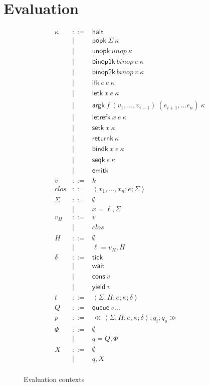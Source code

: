 \documentclass[twocolumn]{article}
\newcommand{\bnfdef}{::=}
\newcommand{\bnfalt}{\mathrel{\mid}}
\newcommand{\kw}[1]{\textsf{#1}}
\newcommand{\clos}[3]{\left<#1; #2; #3\right>}
\newcommand{\thread}[5]{\left<#1; #2; #3; #4; #5\right>}
\newcommand{\proc}[3]{\ll\!#1; #2; #3\!\gg}
\begin{document}
\section{Evaluation}

\begin{figure}
\begin{equation*}
\begin{array}{lcl}
  \kappa
     & \bnfdef & \kw{halt} \\
     & \bnfalt & \kw{popk}~ \Sigma~ \kappa \\
     & \bnfalt & \kw{unopk}~ unop~ \kappa \\
     & \bnfalt & \kw{binop1k}~ binop~ e~ \kappa \\
     & \bnfalt & \kw{binop2k}~ binop~ v~ \kappa  \\
     & \bnfalt & \kw{ifk}~ e~ e~ \kappa \\
     & \bnfalt & \kw{letk}~ x~ e~ \kappa \\
     & \bnfalt & \kw{argk}~ f~ (v_1, \ldots, v_{i-1})~ (e_{i+1}, \ldots e_n)~ \kappa \\
     & \bnfalt & \kw{letrefk}~ x~ e~ \kappa \\
     & \bnfalt & \kw{setk}~ x~ \kappa \\
     & \bnfalt & \kw{returnk}~ \kappa \\
     & \bnfalt & \kw{bindk}~ x~ e~ \kappa \\
     & \bnfalt & \kw{seqk}~ e~ \kappa \\
     & \bnfalt & \kw{emitk} \\
  v
     & \bnfdef & k \\
  clos
     & \bnfdef & \clos{x_1, \ldots, x_n}{e}{\Sigma} \\
  \Sigma
     & \bnfdef & \emptyset \\
     & \bnfalt & x = \ell, \Sigma \\
  v_H
     & \bnfdef & v \\
     & \bnfalt & clos \\
  H
     & \bnfdef & \emptyset \\
     & \bnfalt & \ell = v_H, H \\
  \delta
     & \bnfdef & \kw{tick} \\
     & \bnfalt & \kw{wait} \\
     & \bnfalt & \kw{cons}~ v \\
     & \bnfalt & \kw{yield}~ v \\
  t
     & \bnfdef & \thread{\Sigma}{H}{e}{\kappa}{\delta} \\
  Q
     & \bnfdef & \kw{queue}~ v \ldots \\
  p
     & \bnfdef & \proc{\thread{\Sigma}{H}{e}{\kappa}{\delta}}{q_i}{q_o} \\
  \Phi
     & \bnfdef & \emptyset \\
     & \bnfalt & q = Q, \Phi \\
  X
     & \bnfdef & \emptyset \\
     & \bnfalt & q, X \\
\end{array}
\end{equation*}
\caption{Evaluation contexts}
\label{fig:lang:context}
\end{figure}
\end{document}

